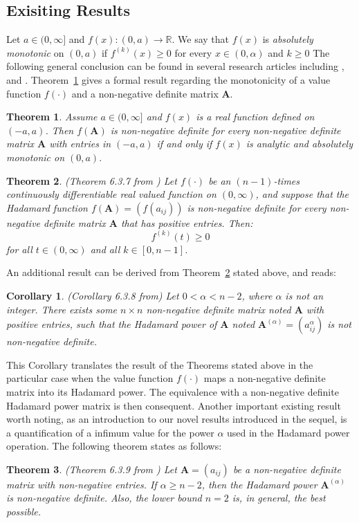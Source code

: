 \documentclass[conference,letterpaper]{IEEEtran}
\numberwithin{equation}{section}
\newcommand{\lbl}{\label}
\newtheorem{theorem}{{\sc Theorem}}[section]
\newtheorem{coro}{{\sc Corollary}}[section]
\begin{document}
\subsection{Exisiting Results}\lbl{known_results}

 Let $a \in (0, \infty]$ and $f(x): (0, a)\to \mathbb{R}$. 
 We say that $f(x)$ is {\it absolutely monotonic} on  $(0, a)$ if $f^{(k)}(x)\geq 0$ for every $x\in (0, \alpha)$ and $k\geq0$ 
 The following general conclusion can be found in several research articles including \cite{schoenberg1988positive},  \cite{vasudeva1979positive} and \cite{hiai2009monotonicity}.
Theorem~\ref{oldth1} gives a formal result regarding the monotonicity of a value function $f(\cdot)$ and a non-negative definite matrix $\mathbf{A}$.
\begin{theorem} \label{oldth1}
Assume $a \in (0, \infty]$ and $f(x)$ is a real function defined on $(-a, a)$.  
Then $f(\mathbf{A})$ is non-negative definite for every non-negative definite matrix  $\mathbf{A}$ with  entries in $(-a, a)$ if and only if $f(x)$ is analytic and absolutely monotonic on $(0, a).$
\end{theorem}


\begin{theorem}\label{oldth2} (Theorem 6.3.7 from \cite{horn_johnson_1991})
	Let $f(\cdot)$ be an $(n-1)$-times continuously differentiable real valued function on $(0,\infty)$, and suppose that the Hadamard function $f(\mathbf{A})=(f(a_{ij}))$ is non-negative definite for every non-negative definite matrix $\mathbf{A}$ that has positive entries. Then:
$$f^{(k)}(t)\geq 0$$
 for all $t\in(0,\infty)$ and all $k \in [0,n-1]$.
\end{theorem}
An additional result can be derived from Theorem~\ref{oldth2} stated above, and reads:
\begin{coro}(Corollary 6.3.8 from\cite{horn_johnson_1991})
	Let $0<\alpha<n-2$, where $\alpha$ is not an integer. 
	There exists some $n\times n$ non-negative definite matrix noted $\mathbf{A}$ with positive entries, such that the Hadamard power of  $\mathbf{A}$ noted $\mathbf{A}^{(\alpha)}=(a_{ij}^\alpha)$ is not non-negative definite.
\end{coro}
This Corollary translates the result of the Theorems stated above in the particular case when the value function $f(\cdot)$ maps a non-negative definite matrix into its Hadamard power. 
The equivalence with a non-negative definite Hadamard power matrix is then consequent.
Another important existing result worth noting, as an introduction to our novel results introduced in the sequel, is a quantification of a infimum value for the power $\alpha$ used in the Hadamard power operation. The following theorem states as follows:
\begin{theorem} (Theorem 6.3.9 from \cite{horn_johnson_1991})
	Let $\mathbf{A}=(a_{ij})$ be a non-negative definite matrix with non-negative entries. If $\alpha \geq n-2$, then the Hadamard power $\mathbf{A}^{(\alpha)}$ is non-negative definite. 
	Also, the lower bound $n=2$ is, in general, the best possible.
\end{theorem}
\end{document}
